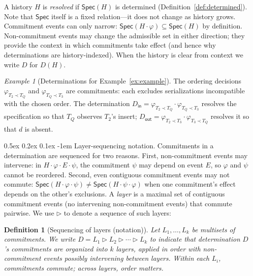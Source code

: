 \documentclass[acmsmall,review,anonymous]{acmart}
\makeatletter
\renewcommand{\paragraph}{\@startsection{paragraph}{4}{\z@}%
  {0.5ex \@plus 0.2ex \@minus 0.1ex}%
  {-1em}%
  {\normalfont\normalsize\bfseries}}
\newcommand{\Spec}{\mathsf{Spec}}
\newcommand{\seq}{\mathbin{\triangleright}}
\newtheorem{definition}{Definition}
\theoremstyle{remark}
\newtheorem{example}{Example}
\numberwithin{definition}{section}
\numberwithin{theorem}{section}
\numberwithin{lemma}{section}
\numberwithin{corollary}{section}
\numberwithin{remark}{section}
\numberwithin{example}{section}
\numberwithin{observation}{section}
\numberwithin{assumption}{section}
\makeatother
\begin{document}
\noindent
A history $H$ is \emph{resolved} if $\Spec(H)$ is determined
(Definition~\ref{def:determined}).
Note that $\Spec$ itself is a fixed relation---it does not change as
history grows.
Commitment events can only narrow: $\Spec(H \cdot \varphi) \subseteq
\Spec(H)$ by definition.
Non-commitment events may change the admissible set in either direction;
they provide the context in which commitments take effect (and hence
why determinations are history-indexed).
When the history is clear from context we write $D$ for $D(H)$.

\begin{example}[Determinations for Example~\ref{ex:example}]
  \label{ex:det-intro}
  The ordering decisions $\varphi_{T_2 \prec T_Q}$ and
  $\varphi_{T_Q \prec T_3}$ are commitments: each excludes
  serializations incompatible with the chosen order.
  The determination $D_{\mathsf{in}} = \varphi_{T_2 \prec T_Q} \cdot
  \varphi_{T_Q \prec T_3}$ resolves the specification so that $T_Q$
  observes $T_2$'s insert; $D_{\mathsf{out}} = \varphi_{T_2 \prec T_3}
  \cdot \varphi_{T_3 \prec T_Q}$ resolves it so that $d$ is absent.
\end{example}

\paragraph{Layer-sequencing notation.}
Commitments in a determination are sequenced for two reasons.
First, non-commitment events may intervene: in
$H \cdot \varphi \cdot E \cdot \psi$, the commitment $\psi$ may depend
on event $E$, so $\varphi$ and $\psi$ cannot be reordered.
Second, even contiguous commitment events may not commute:
$\Spec(H \cdot \varphi \cdot \psi) \neq \Spec(H \cdot \psi \cdot \varphi)$
when one commitment's effect depends on the other's exclusions.
A \emph{layer} is a maximal set of contiguous commitment events (no
intervening non-commitment events) that commute pairwise.
We use $\seq$ to denote a sequence of such layers:

\begin{definition}[Sequencing of layers (notation)]
  \label{def:layer-seq}
  Let $L_1,\ldots,L_k$ be multisets of commitments.
  We write $D = L_1 \seq L_2 \seq \cdots \seq L_k$ to indicate that
  determination $D$'s commitments are organized into $k$ layers, applied
  in order with non-commitment events possibly intervening between
  layers.
  Within each $L_i$, commitments commute; across layers, order
  matters.
\end{definition}
\end{document}
